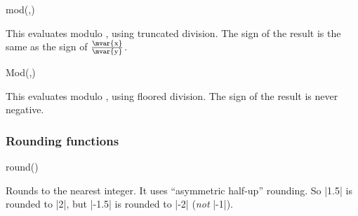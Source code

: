 \begin{math-function}{mod(,)}
\mathcommand

	This evaluates  modulo , using truncated division.
	The sign of the result is the same as the sign of
	$\frac{\textrm{\mvar{x}}}{\textrm{\mvar{y}}}$.

\begin{codeexample}[]
 \pgfmathresult
\end{codeexample}

\begin{codeexample}[]
 \pgfmathresult
\end{codeexample}

\end{math-function}

\begin{math-function}{Mod(,)}
\mathcommand

	This evaluates  modulo , using floored division.
	The sign of the result is never negative.

\begin{codeexample}[]
 \pgfmathresult
\end{codeexample}

\end{math-function}





\subsubsection{Rounding functions}

\label{pgfmath-functions-rounding}

\begin{math-function}{round()}
\mathcommand

	Rounds  to the nearest integer. It uses ``asymmetric half-up''
	rounding. So |1.5| is rounded to |2|, but |-1.5| is rounded to |-2|
	(\emph{not} |-1|).

\begin{codeexample}[]
 \pgfmathresult
\end{codeexample}

\begin{codeexample}[]
 \pgfmathresult
\end{codeexample}

\end{math-function}

